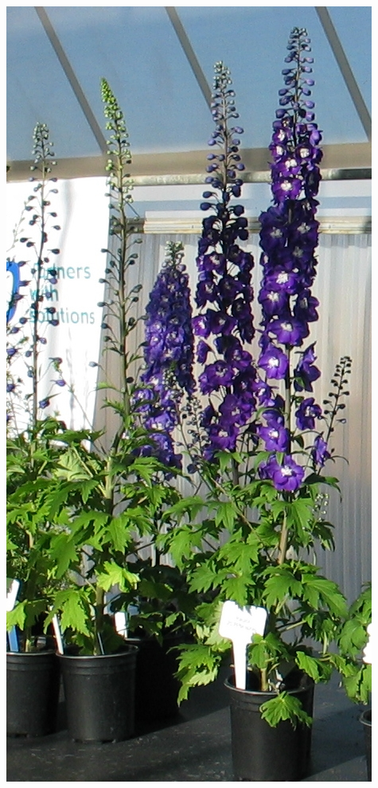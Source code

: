 \documentclass{article}
\begin{document}
\begin{center}
\includegraphics[width=0.9\textheight, angle=90]{../Delphinium.jpg}
\end{center}
\newpage
\end{document}
